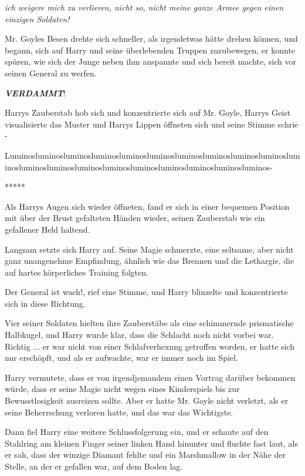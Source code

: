 \emph{ich weigere mich zu verlieren, nicht so, nicht meine ganze Armee gegen
einen einzigen Soldaten!\grqq{}}

Mr. Goyles Besen drehte sich schneller, als irgendetwas hätte drehen können, und
begann, sich auf Harry und seine überlebenden Truppen zuzubewegen, er konnte
spüren, wie sich der Junge neben ihm anspannte und sich bereit machte, sich vor
seinen General zu werfen.

\textbf{\emph{VERDAMMT}}!

Harrys Zauberstab hob sich und konzentrierte sich auf Mr. Goyle, Harrys Geist
visualisierte das Muster und Harrys Lippen öffneten sich und seine Stimme schrie
-

\glqq{}Luminosluminosluminosluminosluminosluminosluminosluminosluminosluminosluminosluminosluminosluminosluminosluminosluminosluminosluminosluminos-\grqq{}

\begin{center}*****\end{center}

Als Harrys Augen sich wieder öffneten, fand er sich in einer bequemen Position
mit über der Brust gefalteten Händen wieder, seinen Zauberstab wie ein
gefallener Held haltend.

Langsam setzte sich Harry auf. Seine Magie schmerzte, eine seltsame, aber nicht
ganz unangenehme Empfindung, ähnlich wie das Brennen und die Lethargie, die auf
hartes körperliches Training folgten.

\glqq{}Der General ist wach!\grqq{}, rief eine Stimme, und Harry blinzelte und
konzentrierte sich in diese Richtung.

Vier seiner Soldaten hielten ihre Zauberstäbe als eine schimmernde prismatische
Halbkugel, und Harry wurde klar, dass die Schlacht noch nicht vorbei war.
Richtig ... er war nicht von einer Schlafverhexung getroffen worden, er hatte
sich nur erschöpft, und als er aufwachte, war er immer noch im Spiel.

Harry vermutete, dass er von irgendjemandem einen Vortrag darüber bekommen
würde, dass er seine Magie nicht wegen eines Kinderspiels bis zur
Bewusstlosigkeit ausreizen sollte. Aber er hatte Mr. Goyle nicht verletzt, als
er seine Beherrschung verloren hatte, und das war das Wichtigste.

Dann fiel Harry eine weitere Schlussfolgerung ein, und er schaute auf den
Stahlring am kleinen Finger seiner linken Hand hinunter und fluchte fast laut,
als er sah, dass der winzige Diamant fehlte und ein Marshmallow in der Nähe der
Stelle, an der er gefallen war, auf dem Boden lag.

